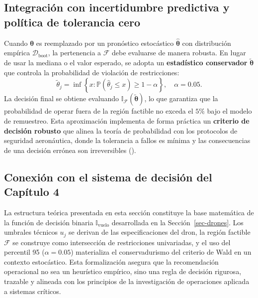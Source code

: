 \documentclass[
  spanish,
  us-letterpaper,
]{scrreprt}
\numberwithin{equation}{section}
\begin{document}
\subsection{Integración con incertidumbre predictiva y política de
tolerancia
cero}\label{integraciuxf3n-con-incertidumbre-predictiva-y-poluxedtica-de-tolerancia-cero}

Cuando \(\boldsymbol{\theta}\) es reemplazado por un pronóstico
estocástico \(\hat{\boldsymbol{\theta}}\) con distribución empírica
\(\mathcal{D}_{\text{boot}}\), la pertenencia a \(\mathcal{F}\) debe
evaluarse de manera robusta. En lugar de usar la mediana o el valor
esperado, se adopta un \textbf{estadístico conservador}
\(\tilde{\boldsymbol{\theta}}\) que controla la probabilidad de
violación de restricciones: \[
\tilde{\theta}_j = \inf \left\{ x : \mathbb{P}(\hat{\theta}_j \leq x) \geq 1 - \alpha \right\}, \quad \alpha = 0.05.
\] La decisión final se obtiene evaluando
\(\mathbb{I}_{\mathcal{F}}(\tilde{\boldsymbol{\theta}})\), lo que
garantiza que la probabilidad de operar fuera de la región factible no
exceda el \(5\%\) bajo el modelo de remuestreo. Esta aproximación
implementa de forma práctica un \textbf{criterio de decisión robusto}
que alinea la teoría de probabilidad con los protocolos de seguridad
aeronáutica, donde la tolerancia a fallos es mínima y las consecuencias
de una decisión errónea son irreversibles
().

\subsection{Conexión con el sistema de decisión del Capítulo
4}\label{conexiuxf3n-con-el-sistema-de-decisiuxf3n-del-capuxedtulo-4}

La estructura teórica presentada en esta sección constituye la base
matemática de la función de decisión binaria
\(\mathbb{I}_{\text{vuelo}}\) desarrollada en la
Sección~\ref{sec-drones}. Los umbrales técnicos \(u_j\) se derivan de
las especificaciones del dron, la región factible \(\mathcal{F}\) se
construye como intersección de restricciones univariadas, y el uso del
percentil 95 (\(\alpha=0.05\)) materializa el conservadurismo del
criterio de Wald en un contexto estocástico. Esta formalización asegura
que la recomendación operacional no sea un heurístico empírico, sino una
regla de decisión rigurosa, trazable y alineada con los principios de la
investigación de operaciones aplicada a sistemas críticos.

\end{document}
